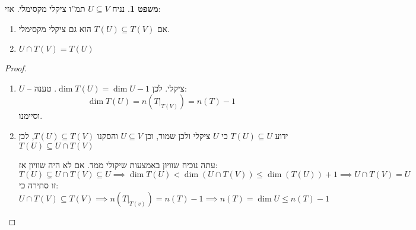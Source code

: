 \documentclass[a4paper]{article}
\newcommand\cl [1]    {\left ( #1 \right )}
\theoremstyle{definition}
\newtheorem{Theorem}{\color{myblue}משפט}
\newcommand\theo  [1] {\begin{Theorem}#1\end{Theorem}}
\begin{document}
	
	\theo{נניח $U \subseteq V$ תמ''ו ציקלי מקסימלי. אזי: 
		\begin{enumerate}
			\item אם $T(U) \subseteq T(V)$ הוא גם ציקלי מקסימלי. 
			\item $U \cap T(V) = T(U)$ 
	\end{enumerate}}
	\begin{proof}\,
		\begin{enumerate}
			\item $U$ – ציקלי. לכן $\dim T(U) = \dim U - 1$. 
			טענה: 
			\[ \dim T(U) = n\cl{T|_{{T(V)}}} = n(T) - 1 \]
			וסיימנו. 
			\item ידוע $T(U) \subseteq U$ כי $U$ ציקלי ולכן שמור, וכן $U \subseteq V$ והסקנו $T(U) \subseteq T(V)$, לכן $T(U) \subseteq U \cap T(V)$
			
			עתה נוכיח שוויון באמצעות שיקולי ממד. אם לא היה שוויון אז: 
			\[ T(U) \subsetneq U \cap T(V) \subseteq U \implies \dim T(U) < \dim (U \cap T(V)) \le \dim (T(U)) + 1 \implies U \cap T(V) = U \]
			זו סתירה כי: 
			\[ U \cap T(V) \subseteq T(V) \implies n(T|_{{T(v)}}) = n(T) - 1 \implies n(T) = \dim U \le n(T) - 1 \]
			
		\end{enumerate}
	\end{proof}
	
\end{document}
